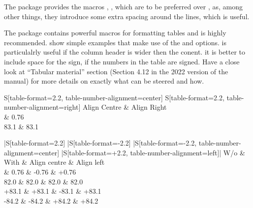 \documentclass[REPORT=false, UKenglish]{atlasdoc}
\begin{document}
The  package provides the macros
, ,  which are to be preferred over ,
as, among other things, they introduce some extra spacing around the lines, which is useful.

The  package contains powerful macros for formatting tables
and is highly recommended.
 show simple examples that make use of the
 and  options.
 is particulalrly useful if the column header is wider then the conent.
it is better to include space for the sign, if the numbers in the table are signed.
Have a close look at \enquote{Tabular material} section
(Section 4.12 in the 2022 version of the  manual)
for more details on exactly what can be steered and how.

\begin{table}[htbp]
\begin{tcblisting}{}
  \caption{Simple table using  column.}
  \label{tab:example0a}
  \centering
  \begin{tabular}{
    S[table-format=2.2, table-number-alignment=center]
    S[table-format=2.2, table-number-alignment=right]
  }
    \toprule
    {Align Centre} & {Align Right} \\
     & 0.76 \\
    83.1 & 83.1 \\
    \bottomrule
  \end{tabular}
\end{tcblisting}
\end{table}

\begin{table}[htbp]
\begin{tcblisting}{}
  \caption{Simple table for numbers with signs using  column.
    Vertical lines are included to show alignment (problems) --
    see the first column.}
  \label{tab:example0b}
  \centering
  \begin{tabular}{
    |S[table-format=2.2]
    |S[table-format=-2.2]
    |S[table-format=-2.2, table-number-alignment=center]
    |S[table-format=+2.2, table-number-alignment=left]|
  }
    \toprule
    {W/o} & {With} & {Align centre} & {Align left} \\
      & 0.76  & -0.76 & +0.76 \\
    82.0  & 82.0  &  82.0 &  82.0 \\
    +83.1 & +83.1 & -83.1 & +83.1 \\
    -84.2 & -84.2 & +84.2 & +84.2 \\
    \bottomrule
  \end{tabular}
\end{tcblisting}
\end{table}
\end{document}
